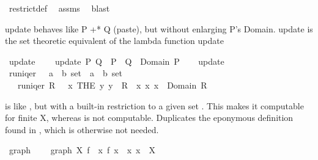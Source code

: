 \begin{isabellebody}
\isamarkupfalse%
\ restrict{\isacharunderscore}def\ \isamarkupfalse%
\ assms\ \isamarkupfalse%
\ blast%
\endisatagproof
{\isafoldproof}%
%
\isadelimproof
%
\endisadelimproof
%
\begin{isamarkuptext}%
update behaves like P +* Q (paste), but without enlarging P's Domain. update is the set theoretic equivalent of the lambda function update %
\end{isamarkuptext}%
\isamarkuptrue%
\isamarkupfalse%
\ update\ \isanewline
\ \ \ {\isachardoublequoteopen}update\ P\ Q\ {\isacharequal}\ P\ {\isacharplus}{\isacharasterisk}\ {\isacharparenleft}Q\ {\isacharbar}{\isacharbar}\ {\isacharparenleft}Domain\ P{\isacharparenright}{\isacharparenright}{\isachardoublequoteclose}\isanewline
\ \ \isamarkupfalse%
\ update\ {\isacharparenleft}\ {\isachardoublequoteopen}{\isacharplus}{\isacharcircum}{\isachardoublequoteclose}\ {}{}{\isacharparenright}\isanewline
\isanewline
\isanewline
{}\isamarkupfalse%
\ runiqer\ \ {\isacharcolon}{\isacharcolon}\ {\isachardoublequoteopen}{\isacharparenleft}{\isacharprime}a\ {\isasymtimes}\ {\isacharprime}b{\isacharparenright}\ set\ {\isacharequal}{\isachargreater}\ {\isacharparenleft}{\isacharprime}a\ {\isasymtimes}\ {\isacharprime}b{\isacharparenright}\ set{\isachardoublequoteclose}\isanewline
\ \ \ {\isachardoublequoteopen}runiqer\ R\ {\isacharequal}\ {\isacharbraceleft}\ {\isacharparenleft}x{\isacharcomma}\ THE\ y{\isachardot}\ y\ {\isasymin}\ R\ {\isacharbackquote}{\isacharbackquote}\ {\isacharbraceleft}x{\isacharbraceright}{\isacharparenright}{\isacharbar}\ x{\isachardot}\ x\ {\isasymin}\ Domain\ R\ {\isacharbraceright}{\isachardoublequoteclose}%
\begin{isamarkuptext}%
 is like , but with a built-in restriction to a given set .
This makes it computable for finite X, whereas  is not computable. 
Duplicates the eponymous definition found in , which is otherwise not needed.%
\end{isamarkuptext}%
\isamarkuptrue%
\isamarkupfalse%
\ graph\ \isanewline
\ \ \ {\isachardoublequoteopen}graph\ X\ f\ {\isacharequal}\ {\isacharbraceleft}{\isacharparenleft}x{\isacharcomma}\ f\ x{\isacharparenright}\ {\isacharbar}\ x{\isachardot}\ x\ {\isasymin}\ X{\isacharbraceright}{\isachardoublequoteclose}\ \isanewline

\end{isabellebody}
